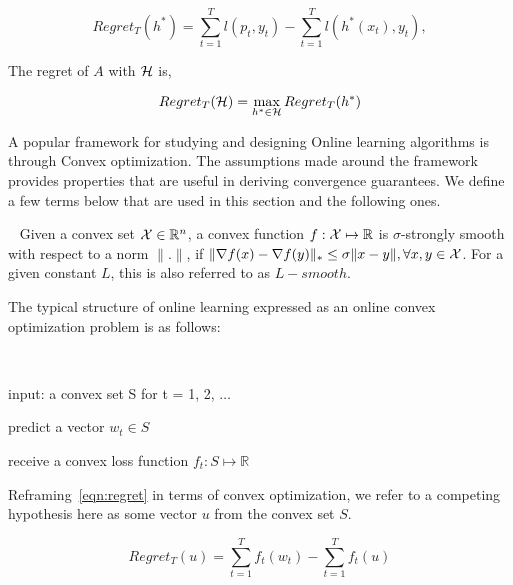 \begin{equation}
	\label{eqn:regret}
	Regret_T(h^*) = \sum_{t=1}^T l(p_t, y_t) - \sum_{t=1}^T l(h^*(x_t), y_t),
\end{equation}

The regret of $A$ with $\mathcal{H}$ is,

\begin{equation}
	\label{eqn:regret_all} Regret_T(\mathcal{H}) = \max_{h^* \in \mathcal{H}} Regret_T(h^*)
\end{equation}

A popular framework for studying and designing Online learning algorithms is
through Convex optimization.
The assumptions made around the framework provides properties that are useful in deriving
convergence guarantees.
We define a few terms below that are used in this section and the following ones.


\begin{definition}~\label{def:strsmooth}
	Given a convex set $\mathcal{X} \in \mathbb{R}^n$, a convex function $f: \mathcal{X} \mapsto \mathbb{R}$ is $\sigma$-strongly
	smooth with respect to a norm $\|.
		\|$, if $\|\nabla f(x) - \nabla f(y) \|_{\ast} \leq \sigma \|x - y \|, \forall x, y \in \mathcal{X}$.
	For a given constant $L$, this is also referred to as $L-smooth$.
\end{definition}



The typical structure of online learning expressed as an online convex optimization problem is as
follows:

\begin{alprocedure}[H] ~\label{alg:oco}

	input: a convex set S for t = 1, 2, 
	$\ldots$

	predict a vector $w_t \in S$

	receive a convex loss function $f_t: S \mapsto \mathbb{R}$
\end{alprocedure}

Reframing~\ref{eqn:regret} in terms of convex optimization, we refer to a competing hypothesis here
as some vector $u$ from the convex set $S$.

\begin{equation}
	Regret_T(u) = \sum_{t=1}^T f_t(w_t) - \sum_{t=1}^T f_t(u)
\end{equation}

